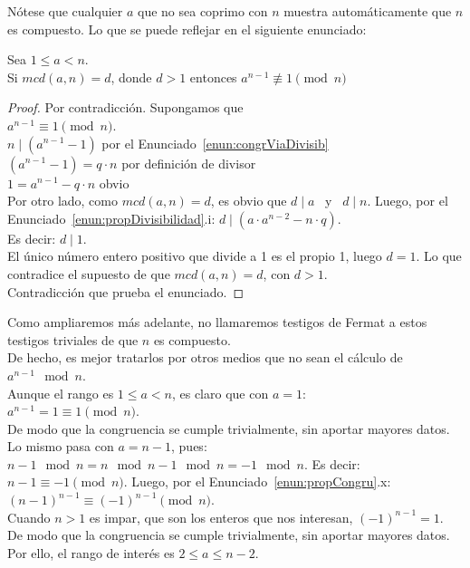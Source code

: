 Nótese que cualquier $a$ que no sea coprimo con $n$ muestra automáticamente que $n$ es compuesto.
Lo que se puede reflejar en el siguiente enunciado:

\begin{enunciado} \label{enun:testigostriviales}\leavevmode\par
Sea $1 \leq a < n$. \\
Si $mcd(a,n)=d$, donde $d>1$ entonces $a^{n-1} \not\equiv  1 \pmod n$
\end{enunciado}

\begin{proof} Por contradicción. Supongamos que \\
$a^{n-1} \equiv  1 \pmod n$. \\
$n \mid (a^{n-1}-1)$ \quad\quad\quad\quad por el Enunciado~\ref{enun:congrViaDivisib} \\
$(a^{n-1}-1) = q \cdot n$ \quad\quad\quad\quad por definición de divisor \\
$1 = a^{n-1} - q \cdot n$ \quad\quad\quad\quad\quad obvio \\
Por otro lado, como $mcd(a,n)=d$, es obvio que $d \mid a$ \, y \, $d \mid n$. Luego, por el Enunciado~\ref{enun:propDivisibilidad}.i: 
$d \mid (a \cdot a^{n-2} - n \cdot q)$.  \\
Es decir: $d \mid 1$. \\
El único número entero positivo que divide a 1 es el propio 1, luego $d=1$.
Lo que contradice el supuesto de que $mcd(a,n)=d$, con $d>1$. \\
Contradicción que prueba el enunciado.
\end{proof}

Como ampliaremos más adelante, no llamaremos testigos de Fermat a estos testigos triviales de que $n$ es compuesto. \\
De hecho, es mejor tratarlos por otros medios que no sean el cálculo de $a^{n-1} \mod n$.  \\

Aunque el rango es $1 \leq a < n$, es claro que con $a=1$: \\
$a^{n-1} = 1 \equiv  1 \pmod n$. \\
De modo que la congruencia se cumple trivialmente, sin aportar mayores datos. \\
Lo mismo pasa con $a=n-1$, pues: 
$n-1 \mod n = n \mod n-1 \mod n = -1 \mod n$. Es decir: \\
$n-1 \equiv -1 \pmod n$. Luego, por el Enunciado~\ref{enun:propCongru}.x: \\
$(n-1)^{n-1} \equiv  (-1)^{n-1} \pmod n$. \\
Cuando $n>1$ es impar, que son los enteros que nos interesan, $(-1)^{n-1}=1$. \\
De modo que la congruencia se cumple trivialmente, sin aportar mayores datos. \\
Por ello, el rango de interés es $2 \leq a \leq n-2$.

